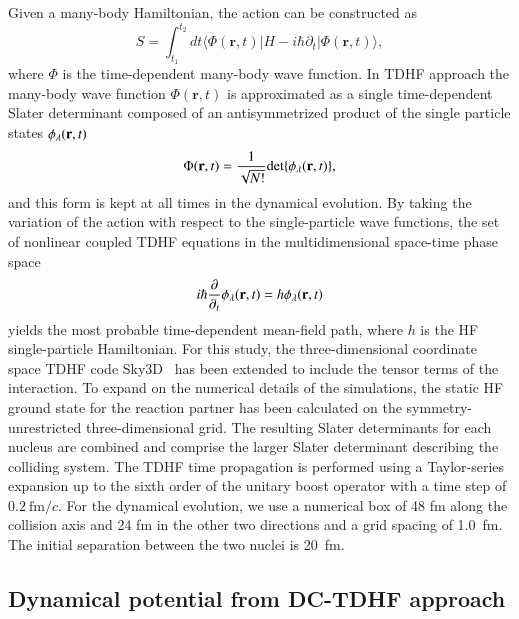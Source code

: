 Given a many-body Hamiltonian, the action can be constructed as
\begin{equation}
S=\int_{t_1}^{t_2} dt \langle \Phi(\textbf{r}, t)|H-i\hbar \partial_t|\Phi(\textbf{r}, t)\rangle ,
\end{equation}
where $\Phi$ is the time-dependent many-body wave function.
In TDHF approach the many-body wave function $\Phi(\mathbf{r}, t)$ is approximated as a single time-dependent Slater determinant composed of an antisymmetrized product
of the single particle states $\phi_{\rm{\lambda}}(\mathbf{r}, t)$
\begin{equation}
\Phi(\mathbf{r}, t)=\frac{1}{\sqrt{N!}}\textrm{det}\{\phi_{\rm{\lambda}}(\mathbf{r}, t)\},
\end{equation}
and this form is kept at all times in the dynamical evolution.
By taking the variation of the action with respect to the single-particle wave functions, the set of nonlinear coupled TDHF equations in the multidimensional
space-time phase space
\begin{equation}
i\hbar \frac{\partial}{\partial_t}\phi_{\rm{\lambda}}(\mathbf{r}, t)=h\phi_{\rm{\lambda}}(\mathbf{r}, t)
\end{equation}
yields the most probable time-dependent mean-field path, where $h$ is the HF single-particle Hamiltonian.
For this study, the three-dimensional coordinate space TDHF code Sky3D~\citep{maruhn2014} has been extended to include the tensor terms of the interaction.
To expand on the numerical details of the simulations, the static HF ground state for the reaction partner has been calculated on the symmetry-unrestricted three-dimensional grid.
The resulting Slater determinants for each nucleus are combined and comprise the larger Slater determinant describing the colliding system.
The TDHF time propagation is performed using a Taylor-series expansion up to the sixth order of the unitary boost operator with a time step of $0.2 ~\mathrm {fm}/c$.
For the dynamical evolution, we use a numerical box of 48 fm along the collision axis and 24 fm in the other two directions and a grid spacing of 1.0~fm.
The initial separation between the two nuclei is 20~fm.

\subsection{Dynamical potential from DC-TDHF approach}

